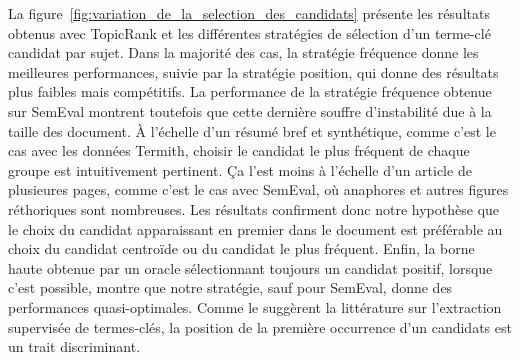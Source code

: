         La figure~\ref{fig:variation_de_la_selection_des_candidats} présente les
        résultats obtenus avec TopicRank et les différentes stratégies de
        sélection d'un terme-clé candidat par sujet. Dans la majorité des cas,
        la stratégie fréquence donne les meilleures performances, suivie par la
        stratégie position, qui donne des résultats plus faibles mais
        compétitifs. La performance de la stratégie fréquence obtenue sur
        SemEval montrent toutefois que cette dernière souffre d'instabilité due
        à la taille des document. À l'échelle d'un résumé bref et synthétique,
        comme c'est le cas avec les données Termith, choisir le candidat le plus
        fréquent de chaque groupe est intuitivement pertinent. Ça l'est moins à
        l'échelle d'un article de plusieures pages, comme c'est le cas avec
        SemEval, où anaphores et autres figures réthoriques sont nombreuses. Les
        résultats confirment donc notre hypothèse que le choix du candidat
        apparaissant en premier dans le document est préférable au choix du
        candidat centroïde ou du candidat le plus fréquent. Enfin, la borne
        haute obtenue par un oracle sélectionnant toujours un candidat positif,
        lorsque c'est possible, montre que notre stratégie, sauf pour SemEval,
        donne des performances quasi-optimales. Comme le suggèrent la
        littérature sur l'extraction supervisée de termes-clés, la position de
        la première occurrence d'un candidats est un trait discriminant.
